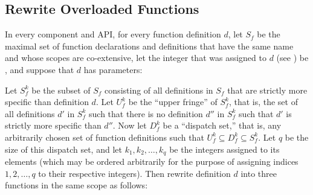 \subsection{Rewrite Overloaded Functions}

In every component and API, for every function definition $d$,
let $S_f$ be the maximal set of function declarations and definitions
that have the same name  and whose scopes are co-extensive,
let the integer that was assigned to $d$ (see ) be ,
and suppose that $d$ has  parameters:
\begin{codeexamplesize}
\begin{tabbing}
\end{tabbing}
\end{codeexamplesize}
Let $S_f^k$ be the subset of $S_f$ consisting of all definitions in $S_f$ that
are strictly more specific than definition $d$.  Let $U_f^k$ be the ``upper fringe'' of $S_f^k$,
that is, the set of all definitions $d'$ in $S_f^k$ such that there is no definition $d''$
in $S_f^k$ such that $d'$ is strictly more specific than $d''$.  Now let $D_f^k$ be a ``dispatch set,''
that is, any arbitrarily chosen set of function definitions such that $U_f^k \subseteq D_f^k \subseteq S_f^k$.
Let $q$ be the size of this
dispatch set, and let $k_1, k_2, \ldots, k_q$ be the integers assigned to its elements (which may be ordered
arbitrarily for the purpose of assigning indices $1, 2, \ldots, q$ to their respective integers).
Then rewrite definition $d$ into three functions in the same scope as follows:
